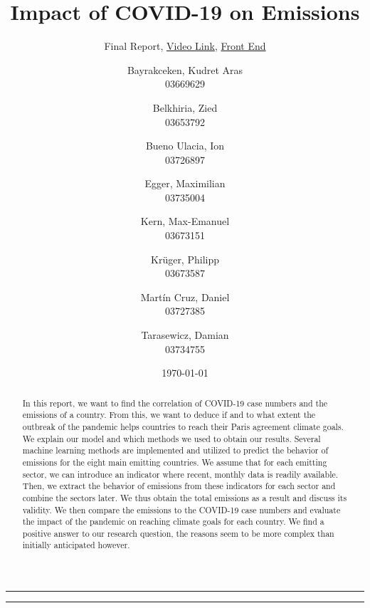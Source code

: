 \documentclass[lang=english,inputenc=utf8,fontsize=10pt]{ldvarticle}
\title{\vspace{-1em}Impact of COVID-19 on \co Emissions}
\subtitle{Final Report, \href{https://drive.google.com/drive/folders/1tArOlfeWDrt7ALLM4qA119iYI_JEB7uF?usp=sharing}{Video Link}, \href{https://ami-group1-dashboard.herokuapp.com/}{Front End}}
\author{Bayrakceken, Kudret Aras\\
	03669629
	\and
	Belkhiria, Zied\\
	03653792
	\and
	Bueno Ulacia, Ion\\
	03726897
	\and
	Egger, Maximilian\\
	03735004
	\and
	Kern, Max-Emanuel\\
	03673151
	\and
	Krüger, Philipp \\
	03673587
	\and
	Martín Cruz, Daniel\\
	03727385
	\and
	Tarasewicz, Damian\\
	03734755
}
\date{\today}
\newcommand{\co}{\text{CO\textsubscript{2} }}
\begin{document}
\maketitle
\thispagestyle{empty}
\begin{abstract}
In this report, we want to find the correlation of COVID-19 case numbers and the \co emissions of a country. From this, we want to deduce if and to what extent the outbreak of the pandemic helps countries to reach their Paris agreement climate goals. We explain our model and which methods we used to obtain our results. Several machine learning methods are implemented and utilized to predict the behavior of \co emissions for the eight main \co emitting countries.  We assume that for each \co emitting sector, we can introduce an indicator where recent, monthly data is readily available. Then, we extract the behavior of \co emissions from these indicators for each sector and combine the sectors later. We thus obtain the total \co emissions as a result and discuss its validity. We then compare the \co emissions to the COVID-19 case numbers and evaluate the impact of the pandemic on reaching climate goals for each country. We find a positive answer to our research question, the reasons seem to be more complex than initially anticipated however. %
\end{abstract}

\vspace{1.5em}
\hrule
\setcounter{tocdepth}{1}
\tableofcontents
\vspace{1.5em}
\hrule
\newpage















\end{document}
